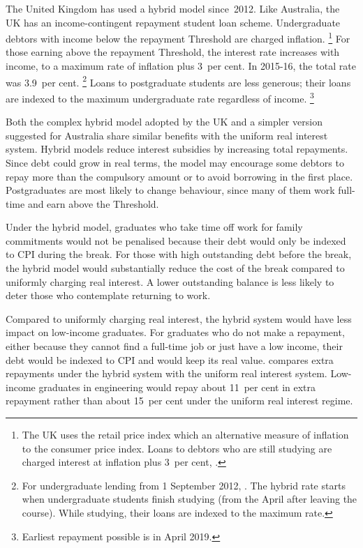 \documentclass{grattan}
\begin{document}
The United Kingdom has used a hybrid model since~2012.
Like Australia, the UK has an income-contingent repayment student loan scheme.
Undergraduate debtors with income below the repayment \gls{Threshold} are charged inflation.%
   \footnote{The UK uses the retail price index which an alternative measure of inflation to the consumer price index.
Loans to debtors who are still studying are charged interest at inflation plus 3~per cent, \textcite{Company2015Studentloanrepayment}.} For those earning above the repayment \gls{Threshold}, the interest rate increases with income, to a maximum rate of inflation plus 3~per cent.
In 2015-16, the total rate was 3.9~per cent.%
   \footnote{For undergraduate lending from 1 September 2012, \textcite{Company2015Studentloanrepayment}.
The hybrid rate starts when undergraduate students finish studying (from the April after leaving the course).
While studying, their loans are indexed to the maximum rate.} Loans to postgraduate students are less generous; their loans are indexed to the maximum undergraduate rate regardless of income.%
   \footnote{Earliest repayment possible is in April 2019.}

Both the complex hybrid model adopted by the UK and a simpler version suggested for Australia share similar benefits with the uniform real interest system.
Hybrid models reduce interest subsidies by increasing total repayments.
Since debt could grow in real terms, the model may encourage some debtors to repay more than the compulsory amount or to avoid borrowing in the first place.
Postgraduates are most likely to change behaviour, since many of them work full-time and earn above the \gls{Threshold}.

Under the hybrid model, graduates who take time off work for family commitments would not be penalised because their debt would only be indexed to \gls{CPI} during the break.
For those with high outstanding debt before the break, the hybrid model would substantially reduce the cost of the break compared to uniformly charging real interest.
A lower outstanding balance is less likely to deter those who contemplate returning to work.

Compared to uniformly charging real interest, the hybrid system would have less impact on low-income graduates.
For graduates who do not make a repayment, either because they cannot find a full-time job or just have a low income, their debt would be indexed to \gls{CPI} and would keep its real value.
 compares extra repayments under the hybrid system with the uniform real interest system.
Low-income graduates in engineering would repay about 11~per cent in extra repayment rather than about 15~per cent under the uniform real interest regime.
\end{document}
